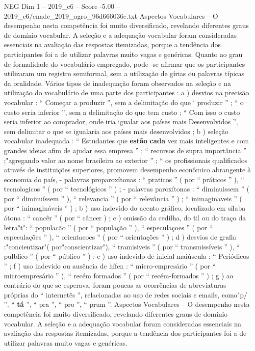 \begin{textsample}{NEG Dim 1 – 2019\_c6 – Score -5.00 – 2019\_c6/enade\_2019\_agro\_96d666036e.txt}
Aspectos Vocabulares – O desempenho nesta competência foi muito diversificado, revelando diferentes graus de domínio vocabular.
A seleção e a adequação vocabular foram consideradas essenciais na avaliação das respostas itemizadas, porque a tendência dos participantes foi a de utilizar palavras muito vagas e genéricas.
Quanto ao grau de formalidade do vocabulário empregado, pode -se afirmar que os participantes utilizaram um registro semiformal, sem a utilização de gírias ou palavras típicas da oralidade.
Vários tipos de inadequação foram observados na seleção e na utilização do vocabulário de uma parte dos participantes : a ) desvios na precisão vocabular : “ Começar a produzir ”, sem a delimitação do que ‘ produzir ” ; “ o custo seria inferior ”, sem a delimitação do que tem custo ; “ Com isso o custo seria inferior ao comprador, onde iria igualar aos países mais Desenvolvidos ”, sem delimitar o que se igualaria aos países mais desenvolvidos ; b ) seleção vocabular inadequada : “ Estudantes que \textbf{estão} \textbf{cada} vez mais inteligentes e com grandes ideias afim de ajudar essa empresa ” ; “ recursos de supra importância ” ;"agregando valor ao nome brasileiro ao exterior ” ; “ os profissionais qualificados através de instituições superiores, promovem desempenho econômico abrangente à economia do país, - palavras proparoxítonas : “ praticos ” ( por “ práticos ” ), “ tecnologicos ” ( por “ tecnológicos ” ) ; - palavras paroxítonas : “ diminuissem ” ( por “ diminuíssem ” ), “ relevancia ” ( por “ relevância ” ) ; “ inimaginaveis ” ( por “ inimagináveis ” ) ; b ) uso indevido do acento gráfico, localizado em sílaba átona : “ cancêr ” ( por “ câncer ) ; c ) omissão da cedilha, do til ou do traço da letra"t": “ populacão ” ( por “ população ” ), “ especulaçoes ” ( por “ especulações ” ), “ orientacoes ” ( por “ orientações ” ) ; d ) desvios de grafia :"concientizar"( por"conscientizar"), “ tramisiveis ” ( por “ transmissíveis ” ), “ pulblico ” ( por “ público ” ) ; e ) uso indevido de inicial maiúscula : “ Periódicos ” ; f ) uso indevido ou ausência de hífen : “ micro-empresário ” ( por “ microempresário ” ), “ recém formados ” ( por “ recém-formados ” ) ; g ) ao contrário do que se esperava, foram poucas as ocorrências de abreviaturas próprias do “ internetês ”, relacionadas ao uso de redes sociais e emails, como"p/ ”, “ \textbf{tá} ”, “ pra ”, “ pro ”, “ prum ”.
Aspectos Vocabulares – O desempenho nesta competência foi muito diversificado, revelando diferentes graus de domínio vocabular.
A seleção e a adequação vocabular foram consideradas essenciais na avaliação das respostas itemizadas, porque a tendência dos participantes foi a de utilizar palavras muito vagas e genéricas.

\end{textsample}
